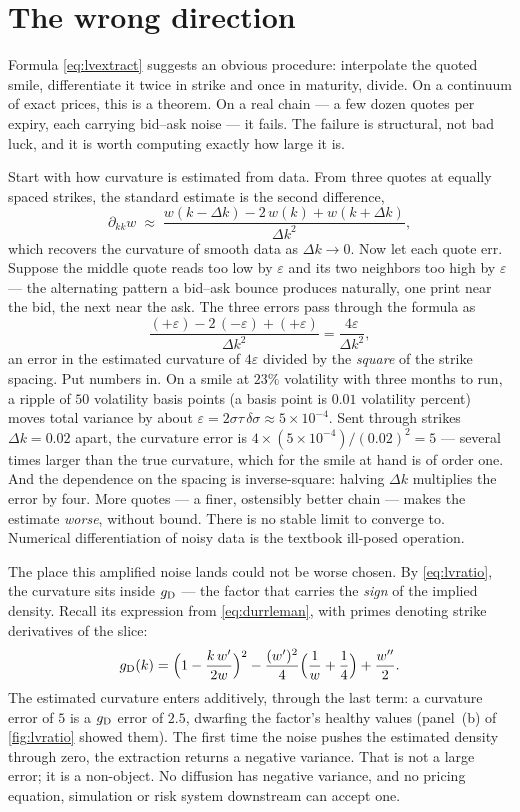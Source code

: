 \section{The wrong direction}
\label{sec:lvillposed}

Formula \eqref{eq:lvextract} suggests an obvious procedure:
interpolate the quoted smile,
differentiate it twice in strike and once in maturity, divide.  On a
continuum of exact prices, this is a theorem.  On a real chain --- a
few dozen quotes per expiry, each carrying bid--ask noise --- it
fails.  The failure is structural, not bad luck, and it is worth
computing exactly how large it is.

Start with how curvature is estimated from data.  From three quotes at
equally spaced strikes, the standard estimate is the second
difference,
\[
\partial_{kk}w\;\approx\;
\frac{w(k-\Delta k)-2\,w(k)+w(k+\Delta k)}{\Delta k^{2}},
\]
which recovers the curvature of smooth data as $\Delta k\to0$.  Now
let each quote err.  Suppose the middle quote reads too low by
$\varepsilon$ and its two neighbors too high by $\varepsilon$ --- the
alternating pattern a bid--ask bounce produces naturally, one print
near the bid, the next near the ask.  The three errors pass through
the formula as
\[
\frac{(+\varepsilon)-2\,(-\varepsilon)+(+\varepsilon)}{\Delta k^{2}}
=\frac{4\varepsilon}{\Delta k^{2}} ,
\]
an error in the estimated curvature of $4\varepsilon$ divided by the
\emph{square} of the strike spacing.  Put numbers in.  On a smile at
$23\%$ volatility with three months to run, a ripple of $50$
volatility basis points (a basis point is $0.01$ volatility percent)
moves total variance by about
$\varepsilon=2\sigma\tau\,\delta\sigma\approx5\times10^{-4}$.  Sent
through strikes $\Delta k=0.02$ apart, the curvature error is
$4\times(5\times10^{-4})/(0.02)^{2}=5$ --- several times larger than
the true curvature, which for the smile at hand is of order one.  And the dependence on
the spacing is inverse-square: halving $\Delta k$ multiplies the
error by four.  More quotes --- a finer, ostensibly better chain ---
makes the estimate \emph{worse}, without bound.  There is no stable
limit to converge to.  Numerical differentiation of noisy data is the
textbook ill-posed operation.

The place this amplified noise lands could not be worse chosen.  By
\eqref{eq:lvratio}, the curvature sits inside $g_{\rm D}$ --- the
factor that carries the \emph{sign} of the implied density.  Recall
its expression from \eqref{eq:durrleman}, with primes denoting strike
derivatives of the slice:
\[
g_{\rm D}(k)=\Big(1-\frac{k\,w'}{2w}\Big)^{2}
-\frac{(w')^{2}}{4}\Big(\frac1w+\frac14\Big)+\frac{w''}{2}.
\]
The estimated curvature enters additively, through the last term: a
curvature error of $5$ is a $g_{\rm D}$ error of $2.5$, dwarfing the
factor's healthy values (panel~(b) of \cref{fig:lvratio} showed
them).  The first
time the noise pushes the estimated density through zero, the
extraction returns a negative variance.  That is not a large error; it
is a non-object.  No diffusion has negative variance, and no pricing
equation, simulation or risk system downstream can accept one.


